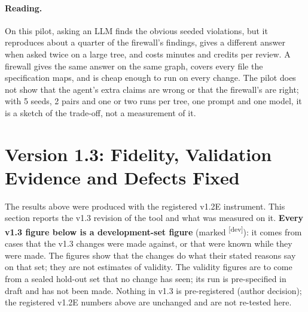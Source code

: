 \documentclass[10pt,a4paper]{article}
\newcommand{\devset}{\textsuperscript{\textsf{\tiny[dev]}}}
\begin{document}
\paragraph{Reading.} On this pilot, asking an LLM finds the obvious seeded violations, but it reproduces about a
quarter of the firewall's findings, gives a different answer when asked twice on a large tree, and costs minutes
and credits per review. A firewall gives the same answer on the same graph, covers every file the specification
maps, and is cheap enough to run on every change. The pilot does not show that the agent's extra claims are wrong
or that the firewall's are right; with 5 seeds, 2 pairs and one or two runs per tree, one prompt and one model, it
is a sketch of the trade-off, not a measurement of it.

\section{Version 1.3: Fidelity, Validation Evidence and Defects Fixed}\label{sec:v13}


The results above were produced with the registered v1.2E instrument. This section reports the v1.3 revision of the
tool and what was measured on it. \textbf{Every v1.3 figure below is a development-set figure} (marked
\devset{}): it comes from cases that the v1.3 changes were made against, or that were known while they were made.
The figures show that the changes do what their stated reasons say on that set; they are not estimates of validity.
The validity figures are to come from a sealed hold-out set that no change has seen; its run is pre-specified in
draft and has not been made. %
Nothing in v1.3 is pre-registered (author decision); the registered v1.2E numbers above are unchanged and are not
re-tested here. %
\end{document}
